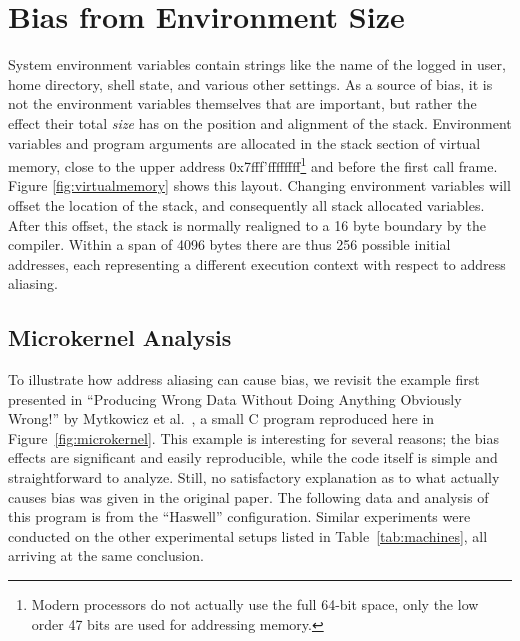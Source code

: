 \documentclass[10pt, conference, compsocconf]{IEEEtran}
\begin{document}
\section{Bias from Environment Size}
\label{sec:environment}
System environment variables contain strings like the name of the logged in user, home directory, shell state, and various other settings.
As a source of bias, it is not the environment variables themselves that are important, but rather the effect their total \emph{size} has on the position and alignment of the stack.
Environment variables and program arguments are allocated in the stack section of virtual memory, close to the upper address 0x7fff'ffffffff\footnote{Modern processors do not actually use the full 64-bit space, only the low order 47 bits are used for addressing memory.} and before the first call frame. Figure \ref{fig:virtualmemory} shows this layout.
Changing environment variables will offset the location of the stack, and consequently all stack allocated variables.
After this offset, the stack is normally realigned to a 16 byte boundary by the compiler.
Within a span of 4096 bytes there are thus 256 possible initial addresses, each representing a different execution context with respect to address aliasing. 

\subsection{Microkernel Analysis}
\label{sec:microkernel}
To illustrate how address aliasing can cause bias, we revisit the example first presented in ``Producing Wrong Data Without Doing Anything Obviously Wrong!'' by Mytkowicz et al.~\cite{Mytkowicz:2009:WrongData}, a small C program reproduced here in Figure~\ref{fig:microkernel}.
This example is interesting for several reasons; the bias effects are significant and easily reproducible, while the code itself is simple and straightforward to analyze.
Still, no satisfactory explanation as to what actually causes bias was given in the original paper.
The following data and analysis of this program is from the ``Haswell'' configuration.
Similar experiments were conducted on the other experimental setups listed in Table~\ref{tab:machines}, all arriving at the same conclusion.
\end{document}
